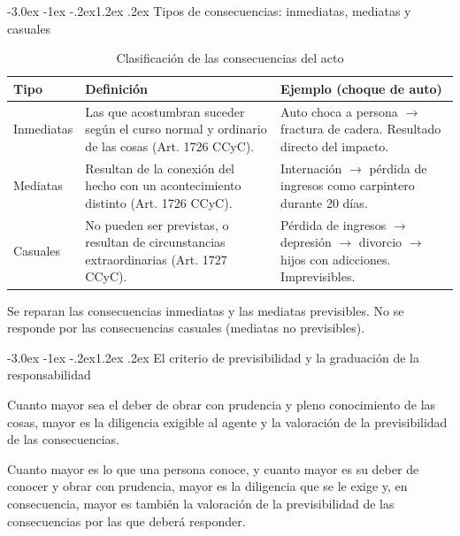 \documentclass[12pt,oneside]{book}
\makeatletter
\renewcommand\section{\@startsection{section}{1}{\z@}%
  {-3.0ex \@plus -1ex \@minus -.2ex}{1.2ex \@plus .2ex}%
  {\normalfont\large\bfseries\color{acento}}}
\makeatother
\begin{document}
\section{Tipos de consecuencias: inmediatas, mediatas y casuales}

\begin{table}[H]
\centering
\caption{Clasificación de las consecuencias del acto}
\begin{tabularx}{\textwidth}{l X X}
\toprule
\textbf{Tipo} & \textbf{Definición} & \textbf{Ejemplo (choque de auto)} \\
\midrule
Inmediatas & Las que acostumbran suceder según el curso normal y ordinario de las cosas (Art. 1726 CCyC). & Auto choca a persona $\rightarrow$ fractura de cadera. Resultado directo del impacto. \\
Mediatas & Resultan de la conexión del hecho con un acontecimiento distinto (Art. 1726 CCyC). & Internación $\rightarrow$ pérdida de ingresos como carpintero durante 20 días. \\
Casuales & No pueden ser previstas, o resultan de circunstancias extraordinarias (Art. 1727 CCyC). & Pérdida de ingresos $\rightarrow$ depresión $\rightarrow$ divorcio $\rightarrow$ hijos con adicciones. Imprevisibles. \\
\bottomrule
\end{tabularx}
\end{table}

\begin{regla}
Se reparan las consecuencias inmediatas y las mediatas previsibles. No se responde por las consecuencias casuales (mediatas no previsibles).
\end{regla}

\section{El criterio de previsibilidad y la graduación de la responsabilidad}

\begin{definicion}
Cuanto mayor sea el deber de obrar con prudencia y pleno conocimiento de las cosas, mayor es la diligencia exigible al agente y la valoración de la previsibilidad de las consecuencias.
\end{definicion}

Cuanto mayor es lo que una persona conoce, y cuanto mayor es su deber de conocer y obrar con prudencia, mayor es la diligencia que se le exige y, en consecuencia, mayor es también la valoración de la previsibilidad de las consecuencias por las que deberá responder.
\end{document}
